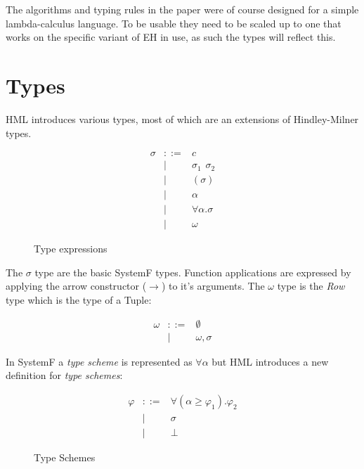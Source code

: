 The algorithms and typing rules in the paper were of course designed for a simple lambda-calculus language. To be usable they need to be scaled up to one that works on the specific variant of EH in use, as such the types will reflect this.
\section{Types}
\label{sec:Types}
HML introduces various types, most of which are an extensions of Hindley-Milner types. 

\begin{figure}[H]
\begin{eqnarray*}
\sigma & ::= & c \\ 
       & | & \sigma_1 \hspace{5pt} \sigma_2 \\
       & | & (\sigma) \\ 
       & | & \alpha \\ 
       & | & \forall \alpha . \sigma \\
       & | & \omega
\end{eqnarray*}
\caption{Type expressions}
\label{types}
\end{figure}

The $\sigma$ type are the basic SystemF types. Function applications are expressed by applying the arrow constructor ($\rightarrow$) to it's arguments. The $\omega$ type is the \emph{Row} type which is the type of a Tuple:

\begin{eqnarray*}
\omega & ::= & \emptyset \\
       & | & \omega , \sigma
\end{eqnarray*}

In SystemF a \emph{type scheme} is represented as $\forall \alpha$ but HML introduces a new definition for \emph{type schemes}:

\begin{figure}[H]
\begin{eqnarray*}
\varphi & ::= & \forall (\alpha \geq \varphi_1). \varphi_2 \\
        & | & \sigma \\
        & | & \bot
\end{eqnarray*}
\caption{Type Schemes}
\label{type-schemes}
\end{figure}

